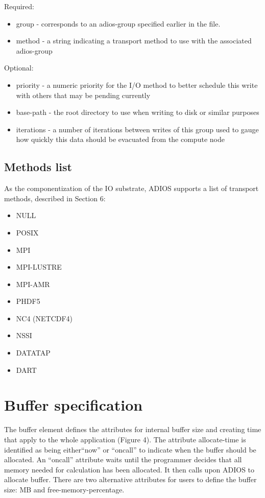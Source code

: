 Required:
\begin{itemize}
\item group - corresponds to an adios-group specified earlier in the file.
\item method - a string indicating a transport method to use with the associated adios-group
\end{itemize}

Optional: 
\begin{itemize}
\item priority - a numeric priority for the I/O method to better schedule this write with 
others that may be pending currently
\item base-path - the root directory to use when writing to disk or similar purposes
\item iterations - a number of iterations between writes of this group used to gauge how 
quickly this data should be evacuated from the compute node
\end{itemize}

\subsection{Methods list}
As the componentization of the IO substrate, ADIOS supports a list of transport 
methods, described in Section 6:

\begin{itemize}
\item NULL
\item POSIX
\item MPI
\item MPI-LUSTRE
\item MPI-AMR
\item PHDF5
\item NC4 (NETCDF4)
\item NSSI
\item DATATAP 
\item DART
\end{itemize}

\section{Buffer specification}
The buffer element defines the attributes for internal buffer size and creating 
time that apply to the whole application (Figure 4). The attribute allocate-time 
is identified as being either{\small  ``}now'' or ``oncall'' to indicate when the 
buffer should be allocated. An ``oncall'' attribute waits until the programmer 
decides that all memory needed for calculation has been allocated. It then calls 
upon ADIOS to allocate buffer. There are two alternative attributes for users to 
define the buffer size: MB and free-memory-percentage. 

